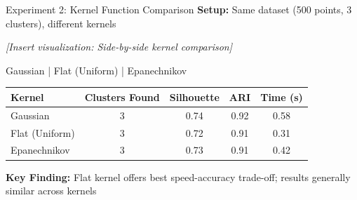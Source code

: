 \begin{frame}{Experiment 2: Kernel Function Comparison}
    \textbf{Setup:} Same dataset (500 points, 3 clusters), different kernels

    \vspace{0.3cm}

    \begin{center}
        \textit{[Insert visualization: Side-by-side kernel comparison]}

        \vspace{0.2cm}

        \small{Gaussian | Flat (Uniform) | Epanechnikov}
    \end{center}

    \vspace{0.3cm}

    \begin{table}
        \centering
        \begin{tabular}{lcccc}
            \toprule
            \textbf{Kernel} & \textbf{Clusters Found} & \textbf{Silhouette} & \textbf{ARI} & \textbf{Time (s)} \\
            \midrule
            Gaussian & 3 & 0.74 & 0.92 & 0.58 \\
            \textcolor{customred}{Flat (Uniform)} & \textcolor{customred}{3} & \textcolor{customred}{0.72} & \textcolor{customred}{0.91} & \textcolor{customred}{0.31} \\
            Epanechnikov & 3 & 0.73 & 0.91 & 0.42 \\
            \bottomrule
        \end{tabular}
    \end{table}

    \vspace{0.2cm}

    \small{\textbf{Key Finding:} Flat kernel offers best speed-accuracy trade-off; results generally similar across kernels}
\end{frame}

